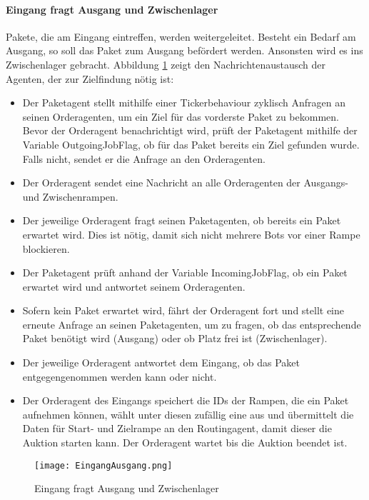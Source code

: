 \paragraph{Eingang fragt Ausgang und Zwischenlager}
Pakete, die am Eingang eintreffen, werden weitergeleitet. Besteht ein Bedarf am Ausgang, so soll das Paket zum Ausgang befördert werden. Ansonsten wird es ins Zwischenlager gebracht. Abbildung \ref{Eingang fragt} zeigt den Nachrichtenaustausch der Agenten, der zur Zielfindung nötig ist:
\begin{itemize}
\item Der Paketagent stellt mithilfe einer Tickerbehaviour zyklisch Anfragen an seinen Orderagenten, um ein Ziel für das vorderste Paket zu bekommen. Bevor der Orderagent benachrichtigt wird, prüft der Paketagent mithilfe der Variable OutgoingJobFlag, ob für das Paket bereits ein Ziel gefunden wurde. Falls nicht, sendet er die Anfrage an den Orderagenten.  
\item Der Orderagent sendet eine Nachricht an alle Orderagenten der Ausgangs- und Zwischenrampen.
\item Der jeweilige Orderagent fragt seinen Paketagenten, ob bereits ein Paket erwartet wird. Dies ist nötig, damit sich nicht mehrere Bots vor einer Rampe blockieren.
\item Der Paketagent prüft anhand der Variable IncomingJobFlag, ob ein Paket erwartet wird und antwortet seinem Orderagenten.
\item Sofern kein Paket erwartet wird, fährt der Orderagent fort und stellt eine erneute Anfrage an seinen Paketagenten, um zu fragen, ob das entsprechende Paket benötigt wird (Ausgang) oder ob Platz frei ist (Zwischenlager).
\item Der jeweilige Orderagent antwortet dem Eingang, ob das Paket entgegengenommen werden kann oder nicht.
\item Der Orderagent des Eingangs speichert die IDs der Rampen, die ein Paket aufnehmen können, wählt unter diesen zufällig eine aus und übermittelt die Daten für Start- und Zielrampe an den Routingagent, damit dieser die Auktion starten kann. Der Orderagent wartet bis die Auktion beendet ist. 
\end{itemize} 
\begin{figure}[h!]
	\centering
		\texttt{[image: EingangAusgang.png]}        
		\caption{Eingang fragt Ausgang und Zwischenlager}
	\label{Eingang fragt}
\end{figure}
